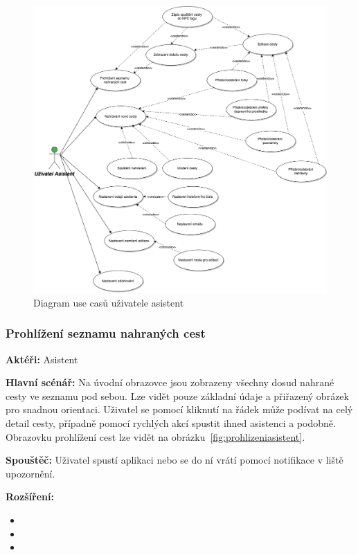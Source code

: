 \documentclass[czech,master,public,dept460,male,java,cpdeclaration]{diploma}
\newcommand{\usecase}[2]{\subsubsection{#1}\label{#2}}
\begin{document}
\begin{figure}[H]
        \centering
                \includegraphics[scale=0.2]{img/UseCasesAsistant.png}
        \caption{Diagram use casů uživatele asistent}
        \label{fig:UseCasesAsistant}
\end{figure}

\usecase{Prohlížení seznamu nahraných cest}{prohlizeniasistent}
\textbf{Aktéři:} Asistent

\vspace{0.1cm}
\noindent
\textbf{Hlavní scénář:} Na úvodní obrazovce jsou zobrazeny všechny dosud nahrané cesty ve seznamu pod sebou.
Lze vidět pouze základní údaje a přiřazený obrázek pro snadnou orientaci. Uživatel se pomocí
kliknutí na řádek může podívat na celý detail cesty, případně pomocí rychlých akcí spustit ihned asistenci
a podobně. Obrazovku prohlížení cest lze vidět na obrázku~\ref{fig:prohlizeniasistent}.

\vspace{0.1cm}
\noindent
\textbf{Spouštěč:} Uživatel spustí aplikaci nebo se do ní vrátí pomocí notifikace v liště upozornění.

\vspace{0.1cm}
\noindent
\textbf{Rozšíření:}
\begin{itemize}
  \item {}
  \item {}
  \item {}
\end{itemize}
\end{document}
